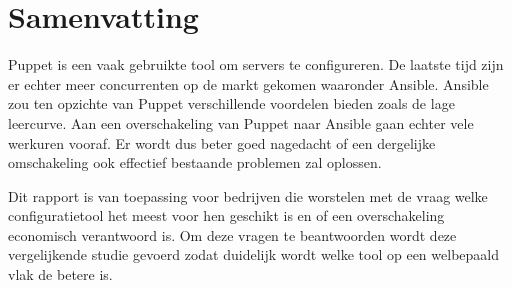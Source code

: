 





\chapter*{Samenvatting}
Puppet is een vaak gebruikte tool om servers te configureren. De laatste tijd zijn er echter meer concurrenten op de markt gekomen waaronder Ansible. Ansible zou ten opzichte van Puppet verschillende voordelen bieden zoals de lage leercurve. Aan een overschakeling van Puppet naar Ansible gaan echter vele werkuren vooraf. Er wordt dus beter goed nagedacht of een dergelijke omschakeling ook effectief bestaande problemen zal oplossen.


Dit rapport is van toepassing voor bedrijven die worstelen met de vraag welke configuratietool het meest voor hen geschikt is en of een overschakeling economisch verantwoord is. Om deze vragen te beantwoorden wordt deze vergelijkende studie gevoerd zodat duidelijk wordt welke tool op een welbepaald vlak de betere is.

